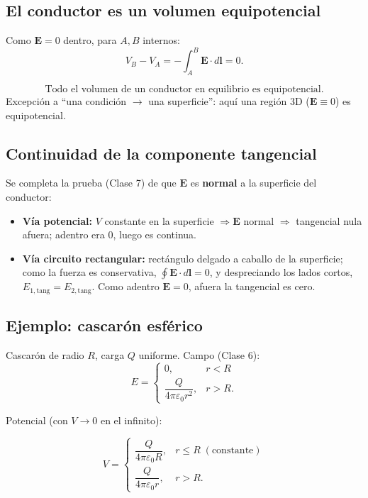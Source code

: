 \documentclass[12pt,a4paper]{article}
\begin{document}
\subsection{El conductor es un volumen equipotencial}

Como $\mathbf{E}=0$ dentro, para $A,B$ internos:
\[
V_B - V_A = -\int_A^B \mathbf{E}\cdot d\mathbf{l} = 0.
\]

\begin{keybox}
  \[
  \boxed{\text{Todo el volumen de un conductor en equilibrio es equipotencial.}}
  \]
  Excepción a \enquote{una condición $\to$ una superficie}: aquí una
  región 3D ($\mathbf{E}\equiv 0$) es equipotencial.
\end{keybox}

\subsection{Continuidad de la componente tangencial}

Se completa la prueba (Clase 7) de que $\mathbf{E}$ es \textbf{normal} a
la superficie del conductor:
\begin{itemize}[nosep]
  \item \textbf{Vía potencial:} $V$ constante en la superficie
        $\Rightarrow \mathbf{E}$ normal $\Rightarrow$ tangencial nula
        afuera; adentro era 0, luego es continua.
  \item \textbf{Vía circuito rectangular:} rectángulo delgado a caballo
        de la superficie; como la fuerza es conservativa,
        $\oint\mathbf{E}\cdot d\mathbf{l}=0$, y despreciando los lados
        cortos, $E_{1,\text{tang}} = E_{2,\text{tang}}$. Como adentro
        $\mathbf{E}=0$, afuera la tangencial es cero.
\end{itemize}

\subsection{Ejemplo: cascarón esférico}

Cascarón de radio $R$, carga $Q$ uniforme. Campo (Clase 6):
\[
E = \begin{cases} 0, & r<R \\[1mm] \dfrac{Q}{4\pi\varepsilon_0 r^2}, & r>R. \end{cases}
\]

Potencial (con $V\to 0$ en el infinito):

\begin{keybox}
  \[
  \boxed{V = \begin{cases}
    \dfrac{Q}{4\pi\varepsilon_0 R}, & r\leq R \;(\text{constante}) \\[2mm]
    \dfrac{Q}{4\pi\varepsilon_0 r}, & r>R.
  \end{cases}}
  \]
\end{keybox}
\end{document}
